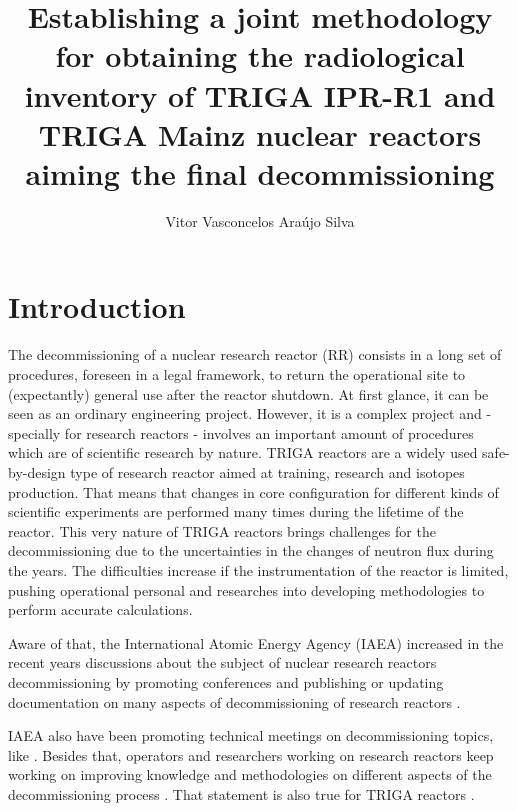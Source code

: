 \documentclass[11pt]{article} %
\title{Establishing a joint methodology for obtaining the radiological inventory of TRIGA IPR-R1 and TRIGA Mainz nuclear reactors aiming the final decommissioning}
\author[1]{Vitor Vasconcelos Araújo Silva}
\affil[1]{Centro de Desenvolvimento da Tecnologia Nuclear - CDTN/CNEN}
\date{} %
\begin{document}
\maketitle

\section{Introduction}

The decommissioning of a nuclear research reactor (RR) consists in a long set of procedures, foreseen in a legal framework, to return the operational site to (expectantly) general use after the reactor shutdown. At first glance, it can be seen as an ordinary engineering project. However, it is a complex project and - specially for research reactors - involves an important amount of procedures which are of scientific research by nature. TRIGA reactors \cite{TRIGA_IAEA_2016} are a widely used safe-by-design type of research reactor aimed at training, research and isotopes production. That means that changes in core configuration for different kinds of scientific experiments are performed many times during the lifetime of the reactor. This very nature of TRIGA reactors brings challenges for the decommissioning due to the uncertainties in the changes of neutron flux during the years. The difficulties increase if the instrumentation of the reactor is limited, pushing operational personal and researches into developing methodologies to perform accurate calculations.

Aware of that, the International Atomic Energy Agency (IAEA) increased in the recent years discussions about the subject of nuclear research reactors decommissioning by promoting conferences \cite{IAEA_PS_2025} and publishing or updating documentation on many aspects of decommissioning of research reactors \cite{IAEA_TRS_494_2024}.

IAEA also have been promoting technical meetings on decommissioning topics, like \cite{EVT2404267,EVT2404274}. Besides that, operators and researchers working on research reactors keep working on improving knowledge and methodologies on different aspects of the decommissioning process \cite{IAEA_deco_bu_2023}. That statement is also true for TRIGA reactors \cite{TRICO_2022, TRIGA2000_2024}.


\end{document}
